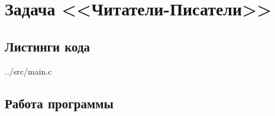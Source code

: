\chapter*{Задача <<Читатели-Писатели>>}

\section*{Листинги кода}

\begin{lstinputlisting}[caption={Реализация задачи.},style={CStyle}]{../src/main.c}
\end{lstinputlisting}

\clearpage
\section*{Работа программы}



